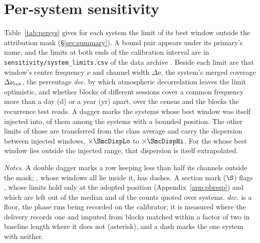 \section{Per-system sensitivity}
\label{app:persys}

Table~\ref{tab:persys} gives for each system the limit of its best window
outside the attribution mask (\S\ref{sec:summary}). A bound pair appears
under its primary's name, and the limits at both ends of the calibration
interval are in \texttt{sensitivity/\allowbreak system\_limits.csv} of the
data archive \citep{SIdeposit}. Beside each limit are that window's centre
frequency $\nu$ and channel width $\Delta\nu$, the system's merged coverage
$\Delta\nu_{\rm cov}$, the percentage \emph{dec.} by which atmospheric
decorrelation leaves the limit optimistic, and whether blocks of different
sessions cover a common frequency more than a day (d) or a year (yr) apart,
over the census and the \ZcNRecEB{} blocks the recurrence test reads. A
dagger marks the \SmcNMeasSys{} systems whose best window was itself injected
into, \SmcNMeasSysBnd{} of them among the \NSysALimSum{} systems with a bounded
position. The other \SmcNEstSysBnd{} limits of those \NSysALimSum{} are transferred
from the class average and carry the dispersion between injected windows,
$\times\SmcDispLo$ to $\times\SmcDispHi$. For the \NgNExtrapSys{}
\NgExtrapSysNoun{} whose best window lies outside the injected range, that
dispersion is itself extrapolated.

\begin{table}
\centering
\caption{\textbf{Per-system sensitivity of the carrier search.} For each of
the \NSysClassA{} systems the fine-channel search covers, the
$\mathrm{EIRP}_{90}$ of its best window, retentions applied, in order of
the limit down the left half and then down the right half. Columns and
marks: Appendix~\ref{app:persys} and the notes below.}
\label{tab:persys}
\footnotesize


{\footnotesize\raggedright \emph{Notes.} A double dagger marks a row
keeping less than half its channels outside the mask; \NSysALostName, whose
\UmNWinALostWin{} windows all lie inside it, has dashes. A section mark
($\S$) flags \OmFlagStars, whose limits hold only at the adopted position
(Appendix~\ref{app:pbresp}) and which are left out of the median and of
the counts quoted over systems.
\emph{dec.} is a floor, the phase rms being recorded on the calibrator; it
is measured where the delivery records one and imputed from blocks matched
within a factor of two in baseline length where it does not (asterisk), and
a dash marks the one system with neither.\par}
\end{table}
